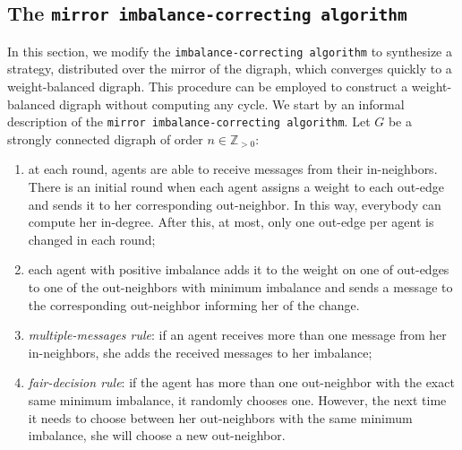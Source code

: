 \documentclass[final]{siamltex}
\begin{document}
\subsection{The {\texttt{mirror imbalance-correcting
    algorithm}\xspace}}\label{sec:weight-balanced-modified}

In this section, we modify the
{\texttt{imbalance-correcting algorithm}\xspace} to synthesize a strategy, distributed over the mirror of the
digraph, which converges quickly to a weight-balanced digraph. This
procedure can be employed to construct a weight-balanced digraph
without computing any cycle. We start by an informal description of
the {\texttt{mirror imbalance-correcting
    algorithm}\xspace}. Let $ G $ be a strongly connected digraph of order $ n\in
\mathbb{Z}_{>0} $:
\begin{enumerate}
\item at each round, agents are able to receive messages from their
  in-neighbors. There is an initial round when each
  agent assigns a weight to each out-edge and sends it to her
  corresponding out-neighbor. In this way, everybody can compute her
  in-degree. After this, at most, only one out-edge per agent is
  changed in each round;
\item each agent with positive imbalance adds it to the weight on one
  of out-edges to one of the out-neighbors with minimum imbalance and
  sends a message to the corresponding out-neighbor informing her of
  the change.
\item \emph{multiple-messages rule}: if an agent receives more than
  one message from her in-neighbors, she adds the received messages to
  her imbalance;
\item \emph{fair-decision rule}: if the agent has more than one
  out-neighbor with the exact same minimum imbalance, it randomly
  chooses one.  However, the next time it needs to choose between her
  out-neighbors with the same minimum imbalance, she will choose a new
  out-neighbor.
\end{enumerate}
\end{document}

